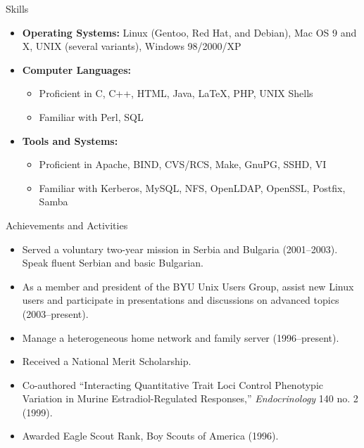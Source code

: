 \documentclass[11pt,oneside]{article}
\newenvironment{ressection}[1]{
	\vspace{4pt}
	{\fontfamily{phv}\selectfont\Large#1}
	\begin{itemize}
	\vspace{3pt}
}{
	\end{itemize}
}
\newcommand{\resitem}[1]{
	\vspace{-4pt}
	\item \begin{flushleft} #1 \end{flushleft}
}
\newcommand{\ressubitem}[1]{
	\vspace{-1pt}
	\item \begin{flushleft} #1 \end{flushleft}
}
\newenvironment{reslist}[1]{
	\resitem{\textbf{#1}}
	\vspace{-5pt}
	\begin{itemize}
}{
	\end{itemize}
}
\begin{document}
\begin{ressection}{Skills}

	\resitem{\textbf{Operating Systems:} Linux (Gentoo, Red Hat, and Debian), Mac OS 9 and X, UNIX (several variants), Windows 98/2000/XP}

	\begin{reslist}{Computer Languages:}

		\ressubitem{Proficient in C, C++, HTML, Java, \LaTeX, PHP, UNIX Shells}

		\ressubitem{Familiar with Perl, SQL}

	\end{reslist}

	\begin{reslist}{Tools and Systems:}

		\ressubitem{Proficient in Apache, BIND, CVS/RCS, Make, GnuPG, SSHD, VI}

		\ressubitem{Familiar with Kerberos, MySQL, NFS, OpenLDAP, OpenSSL, Postfix, Samba}

	\end{reslist}


\end{ressection}


\begin{ressection}{Achievements and Activities}

	\resitem{Served a voluntary two-year mission in Serbia and Bulgaria (2001--2003).  Speak fluent Serbian and basic Bulgarian.}

	\resitem{As a member and president of the BYU Unix Users Group, assist new Linux users and participate in presentations and discussions on advanced topics (2003--present).}

	\resitem{Manage a heterogeneous home network and family server (1996--present).}

	\resitem{Received a National Merit Scholarship.}

	\resitem{Co-authored ``Interacting Quantitative Trait Loci Control Phenotypic Variation in Murine Estradiol-Regulated Responses,'' \textit{Endocrinology} 140 no. 2 (1999).}

	\resitem{Awarded Eagle Scout Rank, Boy Scouts of America (1996).}


\end{ressection}
\end{document}
